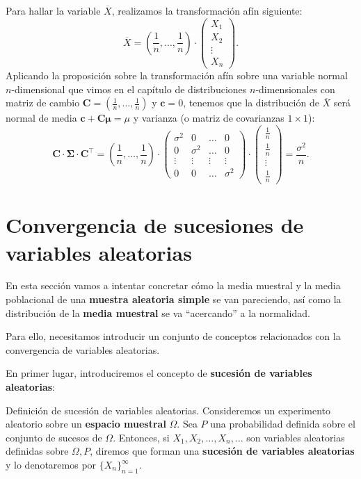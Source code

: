 \documentclass[]{book}
\begin{document}
Para hallar la variable \(\overline{X}\), realizamos la transformación afín siguiente:
\[
\overline{X}=\left(\frac{1}{n},\ldots,\frac{1}{n}\right)\cdot\begin{pmatrix} X_1 \\ X_2\\\vdots \\ X_n \end{pmatrix}.
\]
Aplicando la proposición sobre la transformación afín sobre una variable normal \(n\)-dimensional que vimos en el capítulo de distribuciones \(n\)-dimensionales con matriz de cambio \(\mathbf{C}=\left(\frac{1}{n},\ldots,\frac{1}{n}\right)\) y \(\mathbf{c}=0\), tenemos que la distribución de \(\overline{X}\) será normal de media \(\mathbf{c}+\mathbf{C}\mathbf{\mu} = \mu\) y varianza (o matriz de covarianzas \(1\times 1\)):
\[
\mathbf{C}\cdot\mathbf{\Sigma}\cdot\mathbf{C}^\top =\left(\frac{1}{n},\ldots,\frac{1}{n}\right)\cdot\begin{pmatrix}
\sigma^2 & 0 & \ldots & 0 \\
0 & \sigma^2 & \ldots & 0 \\
\vdots & \vdots & \vdots & \vdots \\
0 & 0 & \ldots & \sigma^2
\end{pmatrix}\cdot \begin{pmatrix}\frac{1}{n}\\\frac{1}{n}\\\vdots\\\frac{1}{n}\end{pmatrix} =\frac{\sigma^2}{n}.
\]

\hypertarget{convergencia-de-sucesiones-de-variables-aleatorias}{%
\section{Convergencia de sucesiones de variables aleatorias}\label{convergencia-de-sucesiones-de-variables-aleatorias}}

En esta sección vamos a intentar concretar cómo la media muestral y la media poblacional de una \textbf{muestra aleatoria simple} se van pareciendo, así como la distribución de la \textbf{media muestral} se va ``acercando'' a la normalidad.

Para ello, necesitamos introducir un conjunto de conceptos relacionados con la convergencia de variables aleatorias.

En primer lugar, introduciremos el concepto de \textbf{sucesión de variables aleatorias}:

 Definición de sucesión de variables aleatorias.
Consideremos un experimento aleatorio sobre un \textbf{espacio muestral} \(\Omega\). Sea \(P\) una probabilidad definida sobre el conjunto de sucesos de \(\Omega\). Entonces, si \(X_1,X_2,\ldots,X_n,\ldots\) son variables aleatorias definidas sobre \(\Omega,P\), diremos que forman una \textbf{sucesión de variables aleatorias} y lo denotaremos por \(\{X_n\}_{n=1}^\infty\).
\end{document}

